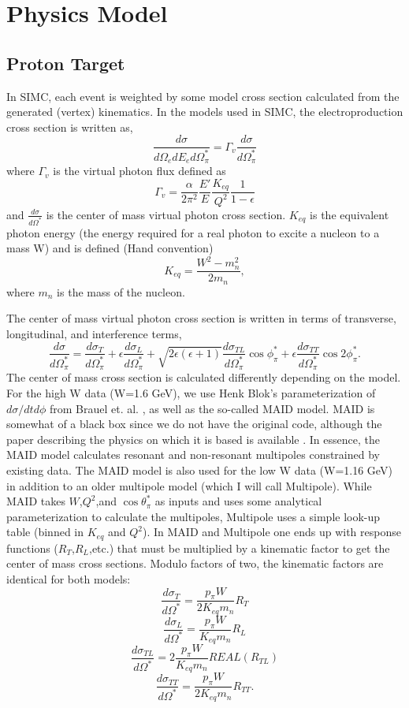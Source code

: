 \section{Physics Model}
\subsection{Proton Target}
In SIMC, each event is weighted by some model cross section calculated
from the generated (vertex) kinematics.  In the models used in SIMC, 
the electroproduction cross section is written as,
$$
\frac{d\sigma}{d\Omega_{e}dE_ed\Omega_{\pi}^{*}} = \Gamma_{v}
\frac{d\sigma}{d\Omega_{\pi}^{*}}
$$
where $\Gamma_v$ is the virtual photon flux defined as
$$
\Gamma_v = \frac{\alpha}{2\pi^2}\frac{E'}{E}\frac{K_{eq}}{Q^2}
\frac{1}{1-\epsilon}
$$
and $\frac{d\sigma}{d\Omega^{*}}$ is the center of mass virtual photon cross 
section.  $K_{eq}$ is the equivalent photon energy (the energy required for a
real photon to excite a nucleon to a mass W) and is defined (Hand 
convention)
$$
K_{eq} = \frac{W^2-m_{n}^2}{2m_{n}},
$$
where $m_n$ is the mass of the nucleon.

The center of mass virtual photon cross section is written in terms of 
transverse, longitudinal, and interference terms,
$$
\frac{d\sigma}{d\Omega_{\pi}^{*}} = \frac{d\sigma_T}{d\Omega_{\pi}^{*}}+
\epsilon\frac{d\sigma_L}{d\Omega_{\pi}^{*}} + \sqrt{2\epsilon(\epsilon+1)}
 \frac{d\sigma_{TL}}{d\Omega_{\pi}^{*}}\cos{\phi_{\pi}^*} +
 \epsilon\frac{d\sigma_{TT}}{d\Omega_{\pi}^{*}}\cos{2\phi_{\pi}^{*}}.
$$
The center of mass cross section is calculated differently depending on 
the model.  For the high W data (W=1.6 GeV), we use Henk Blok's 
parameterization of $d\sigma/dtd\phi$ from Brauel et. al. \cite{Brauel}, as 
well as the so-called MAID model.  MAID is 
somewhat of a black box since we do not have the original code, although the 
paper describing the physics on which it is based is available \cite{Tiator}.
In essence, the MAID model calculates resonant and non-resonant multipoles
constrained by existing data.  The MAID model is also used for the low W
data (W=1.16 GeV) in addition to an older multipole model (which I will call 
Multipole).  While MAID takes $W$,$Q^2$,and $\cos{\theta_{\pi}^*}$ as inputs 
and uses some analytical parameterization to calculate the multipoles, 
Multipole uses a simple look-up table (binned in $K_{eq}$ and $Q^2$).
In MAID and Multipole one ends up with response functions ($R_T$,$R_L$,etc.) 
that must be multiplied by a kinematic factor to get the center of mass cross 
sections.  Modulo factors of two, the kinematic factors are identical for both
models:
$$
\frac{d\sigma_T}{d\Omega^*} = \frac{p_{\pi}W}{2K_{eq}m_n}R_T
$$
$$
\frac{d\sigma_L}{d\Omega^*} = \frac{p_{\pi}W}{K_{eq}m_n}R_L
$$
$$
\frac{d\sigma_{TL}}{d\Omega^*} = 2\frac{p_{\pi}W}{K_{eq}m_n}REAL(R_{TL})
$$
$$
\frac{d\sigma_{TT}}{d\Omega^*} = \frac{p_{\pi}W}{2K_{eq}m_n}R_{TT}.
$$

